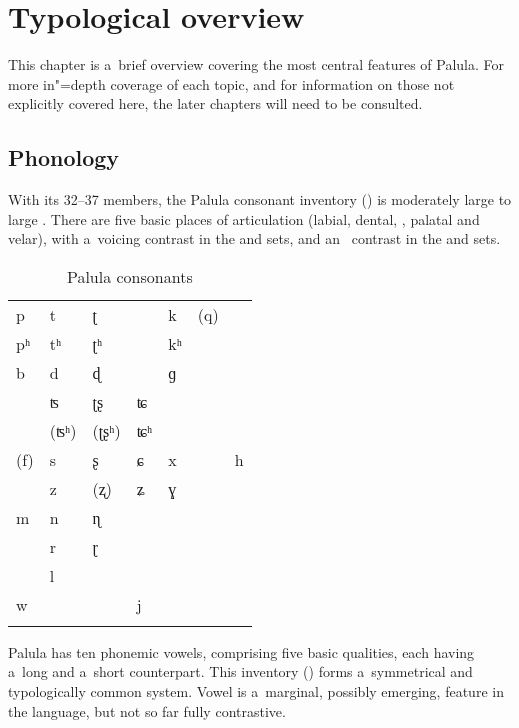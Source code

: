 \chapter{Typological overview}
\label{chap:2}

This chapter is a~brief overview covering the most central features of Palula. For more in"=depth coverage of each topic, and for information on those not explicitly covered here, the later chapters will need to be consulted.


\section{Phonology}
\label{sec:2-1}


With its 32--37 members, the Palula consonant inventory () is moderately large to large \citep{maddieson_consonant_2013}. There are five basic places of articulation (labial, dental, , palatal and velar), with a~voicing contrast in the  and  sets, and an~ contrast in the  and  sets. 


\begin{table}
\caption{Palula consonants}
\begin{tabularx}{\textwidth}{ Q Q Q Q Q Q Q }
\lsptoprule
p &
t &
ʈ &
&
k &
(q) &
\\
pʰ &
tʰ &
ʈʰ &
&
kʰ &
&
\\
b &
d &
ɖ &
&
ɡ &
&
\\
&
ʦ &
ʈʂ &
ʨ &
&
&
\\
&
(ʦʰ) &
(ʈʂʰ) &
ʨʰ &
&
&
\\
(f) &
s &
ʂ &
ɕ &
x &
&
h\\
&
z &
(ʐ) &
ʑ &
ɣ &
&
\\
m &
n &
ɳ &
&
&
&
\\
&
r &
ɽ &
&
&
&
\\
&
l &
&
&
&
&
\\
w &
&
&
j &
&
&
\\\lspbottomrule
\end{tabularx}
\label{tab:2-cons}
\end{table}


Palula has ten phonemic vowels, comprising five basic qualities, each having a~long and a~short counterpart. This inventory () forms a~symmetrical and typologically common system. Vowel  is a~marginal, possibly emerging, feature in the language, but not so far fully contrastive. 



